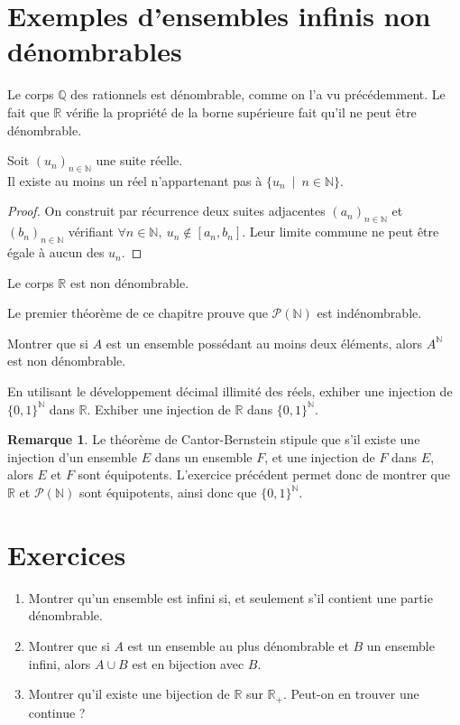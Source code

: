 \documentclass[french]{article}
\newcommand{\N}{\mathbb{N}}
\newcommand{\Q}{\mathbb{Q}}
\newcommand{\R}{\mathbb{R}}
\theoremstyle{plain}
\theoremstyle{definition}
\newtheorem*{rmq}{Remarque}
\theoremstyle{remark}
\begin{document}
\section{Exemples d'ensembles infinis non dénombrables}

Le corps $\Q$ des rationnels est dénombrable, comme on l'a vu précédemment. Le fait que $\R$ vérifie la propriété de la borne supérieure fait qu'il ne peut être dénombrable.

\begin{lem}%
	Soit $(u_n)_{n\in\N}$ une suite réelle.\\
	Il existe au moins un réel n'appartenant pas à $\{u_n\ \mid \ n\in\N\}$.
\end{lem}
\begin{proof}
	On construit par récurrence deux suites adjacentes $(a_n)_{n\in\N}$ et $(b_n)_{n\in\N}$ vérifiant $\forall n\in\N,\  u_n\notin[a_n,b_n]$. Leur limite commune ne peut être égale à aucun des $u_n$.
\end{proof}

\begin{cor}%
	Le corps $\R$ est non dénombrable.
\end{cor}

Le premier théorème de ce chapitre prouve que $\mathcal{P}(\N)$ est indénombrable.

\begin{exo}
	Montrer que si $A$ est un ensemble possédant au moins deux éléments, alors $A^\N$ est non dénombrable.
\end{exo}

\begin{exo}
	En utilisant le développement décimal illimité des réels, exhiber une injection de $\{0,1\}^\N$ dans $\R$. Exhiber une injection de $\R$ dans $\{0,1\}^\N$.
\end{exo}

\begin{rmq}
	Le théorème de Cantor-Bernstein stipule que s'il existe une injection d'un ensemble $E$ dans un ensemble $F$, et une injection de $F$ dans $E$, alors $E$ et $F$ sont équipotents. L'exercice précédent permet donc de montrer que $\R$ et $\mathcal{P}(\N)$ sont équipotents, ainsi donc que $\{0,1\}^\N$.
\end{rmq}

\section{Exercices}

\begin{exo}
	\begin{enumerate}
		\item Montrer qu'un ensemble est infini si, et seulement s'il contient une partie dénombrable.
		\item Montrer que si $A$ est un ensemble au plus dénombrable et $B$ un ensemble infini, alors $A\cup B$ est en bijection avec $B$.
		\item Montrer qu'il existe une bijection de $\R$ sur $\R_+$. Peut-on en trouver une continue ?
	\end{enumerate}
\end{exo}
\end{document}
